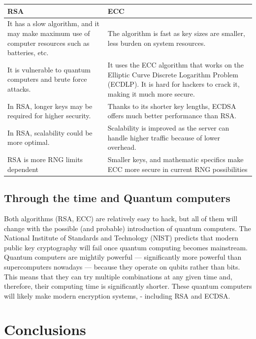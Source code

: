 \documentclass[runningheads]{llncs}
\begin{document}
\begin{center}
\begin{tabular}{ | m{6cm} | m{6cm} | }
\hline
RSA & ECC \\
\hline
It has a slow algorithm, and it may make maximum use of computer resources such as batteries, etc. & The algorithm is fast as key sizes are smaller, less burden on system resources. \\
\hline
It is vulnerable to quantum computers and brute force attacks. & It uses the ECC algorithm that works on the Elliptic Curve Discrete Logarithm Problem (ECDLP). It is hard for hackers to crack it, making it much more secure. \\
\hline
In RSA, longer keys may be required for higher security. & Thanks to its shorter key lengths, ECDSA offers much better performance than RSA. \\
\hline
In RSA, scalability could be more optimal. & Scalability is improved as the server can handle higher traffic because of lower overhead. \\
\hline
RSA is more RNG limits dependent & Smaller keys, and mathematic specifics make ECC more secure in current RNG possibilities \\
\hline
\end{tabular}
\end{center}

\subsection{Through the time and Quantum computers}
\label{sub-sec:6-3}

Both algorithms (RSA, ECC) are relatively easy to hack, but all of them will change with the possible (and probable) introduction of quantum computers. The National Institute of Standards and Technology (NIST) predicts that modern public key cryptography will fail once quantum computing becomes mainstream. Quantum computers are mightily powerful — significantly more powerful than supercomputers nowadays — because they operate on qubits rather than bits. This means that they can try multiple combinations at any given time and, therefore, their computing time is significantly shorter. These quantum computers will likely make modern encryption systems, - including RSA and ECDSA.

\section{Conclusions}
\label{sec:7}
\end{document}
